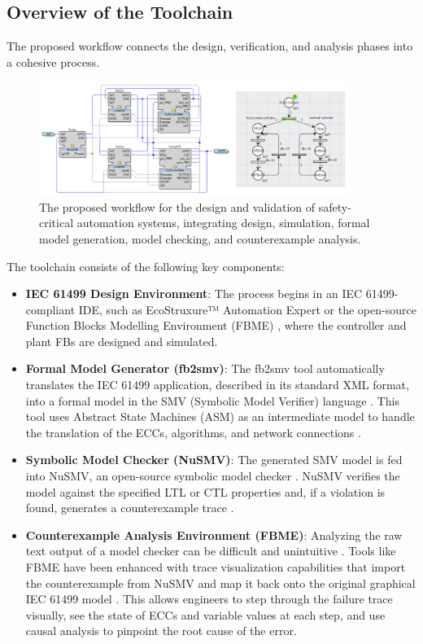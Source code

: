 \subsection{Overview of the Toolchain}

The proposed workflow connects the design, verification, and analysis phases into a cohesive process.

\begin{figure}[h]
\centering
\includegraphics[width=0.9\textwidth]{chapters/images/chapter2/system_functional_model.png}
\caption{The proposed workflow for the design and validation of safety-critical automation systems, integrating design, simulation, formal model generation, model checking, and counterexample analysis.}
\label{fig:workflow}
\end{figure}

The toolchain consists of the following key components:

\begin{itemize}
\item \textbf{IEC 61499 Design Environment}: The process begins in an IEC 61499-compliant IDE, such as EcoStruxure™ Automation Expert or the open-source Function Blocks Modelling Environment (FBME) \cite{FBME}, where the controller and plant FBs are designed and simulated.

\item \textbf{Formal Model Generator (fb2smv)}: The fb2smv tool automatically translates the IEC 61499 application, described in its standard XML format, into a formal model in the SMV (Symbolic Model Verifier) language \cite{drozdov2021formal}. This tool uses Abstract State Machines (ASM) as an intermediate model to handle the translation of the ECCs, algorithms, and network connections \cite{gurevich1995evolving}.

\item \textbf{Symbolic Model Checker (NuSMV)}: The generated SMV model is fed into NuSMV, an open-source symbolic model checker \cite{Cimatti2002}. NuSMV verifies the model against the specified LTL or CTL properties and, if a violation is found, generates a counterexample trace \cite{nusmv}.

\item \textbf{Counterexample Analysis Environment (FBME)}: Analyzing the raw text output of a model checker can be difficult and unintuitive \cite{Ovsiannikova2021}. Tools like FBME have been enhanced with trace visualization capabilities that import the counterexample from NuSMV and map it back onto the original graphical IEC 61499 model \cite{liakh2022formal}. This allows engineers to step through the failure trace visually, see the state of ECCs and variable values at each step, and use causal analysis to pinpoint the root cause of the error.
\end{itemize}

